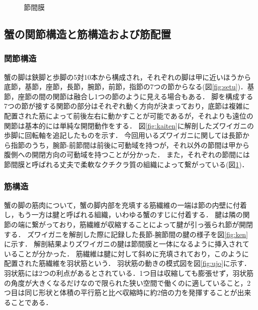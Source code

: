 \begin{figure}[t]
\begin{minipage}{0.5\hsize}
    \caption{節間膜}
    \label{fig:maku}
  \end{minipage}
\end{figure}
\vspace{15mm}
\subsection{蟹の関節構造と筋構造および筋配置}
\subsubsection{関節構造}
蟹の脚は鋏脚と歩脚の5対10本から構成され，それぞれの脚は甲に近いほうから底節，基節，座節，長節，腕節，前節，指節の7つの節からなる(図\ref{fig:setu})．基節，座節の間の関節は融合し1つの節のように見える場合もある\cite{crabnature}．
脚を構成する7つの節が接する関節の部分はそれぞれ動く方向が決まっており，底節は複雑に配置された筋によって前後左右に動かすことが可能であるが，それよりも遠位の関節は基本的には単純な開閉動作をする．
図\ref{fig:kaiten}に解剖したズワイガニの歩脚に回転軸を追記したものを示す．
今回用いるズワイガニに関しては長節から指節のうち，腕節-前節間は前後に可動域を持つが，それ以外の節間は甲から腹側への開閉方向の可動域を持つことが分かった．
また，それぞれの節間には節間膜と呼ばれる丈夫で柔軟なクチクラ質の組織によって繋がっている(図\ref{fig:maku})．
\subsubsection{筋構造}
蟹の脚の筋肉について，蟹の脚内部を充填する筋繊維の一端は節の内壁に付着し，もう一方は腱と呼ばれる組織，いわゆる蟹のすじに付着する．
腱は隣の関節の端に繋がっており，筋繊維が収縮することによって腱が引っ張られ節が開閉する．
ズワイガニを解剖した際に記録した長節-腕節間の腱の様子を図\ref{fig:ken}に示す．
解剖結果よりズワイガニの腱は節間膜と一体になるように挿入されていることが分かった．
筋繊維は腱に対して斜めに充填されており，このように配置された筋繊維を羽状筋という．
羽状筋の動きの模式図を図\ref{fig:ujo}に示す．
羽状筋には2つの利点があるとされている．1つ目は収縮しても膨張せず，羽状筋の角度が大きくなるだけなので限られた狭い空間で働くのに適していること，2つ目は同じ形状と体積の平行筋と比べ収縮時に約2倍の力を発揮することが出来ることである\cite{warner1977biology}．
